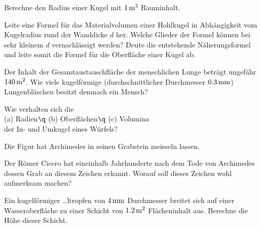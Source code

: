 \documentclass[%
11pt,%
twoside,%
titlepage,%
german,%
headsepline%
]{scrartcl}
\begin{document}
\begin{ueb}
Berechne den Radius einer Kugel mit $\unit[1]{m^3}$ Rauminhalt.
\end{ueb}

\begin{ueb}
Leite eine Formel f\"ur das Materialvolumen einer Hohlkugel in Abh\"angigkeit vom Kugelradius rund der Wanddicke $d$ her. Welche Glieder der Formel k\"onnen bei sehr kleinem $d$ vernachl\"assigt werden? Deute die entstehende N\"aherungsformel und leite somit die Formel f\"ur die Oberfl\"ache einer Kugel ab.
\end{ueb}

\begin{ueb}
Der Inhalt der Gesamtaustauschfl\"ache der menschlichen Lunge betr\"agt ungef\"ahr $\unit[140]{m^2}$. Wie viele kugelf\"ormige (durchschnittlicher Durchmesser $\unit[0.3]{mm}$) Lungenbl\"aschen besitzt demnach ein Mensch?
\end{ueb}

\begin{ueb}
Wie verhalten sich die\\[1ex]
\hspace*{2.7ex}(a) Radien$\q$ (b) Oberfl\"achen$\q$ (c) Volumina\\[1ex]
der In- und Umkugel eines W\"urfels?
\end{ueb}

\begin{ueb}
Die Figur hat Archimedes in seinen Grabstein meisseln lassen.
\begin{center}
\end{center}
Der R\"omer Cicero hat eineinhalb Jahrhunderte nach dem Tode von Archimedes dessen Grab an diesem Zeichen erkannt. Worauf soll dieses Zeichen wohl aufmerksam machen?
\end{ueb}

\begin{ueb}
Ein kugelf\"ormiger …ltropfen von $\unit[4]{mm}$ Durchmesser breitet sich auf einer Wasseroberfl\"ache zu einer Schicht von $\unit[1.2]{m^2}$ Fl\"acheninhalt aus. Berechne die H\"ohe dieser Schicht.
\end{ueb}
\end{document}
